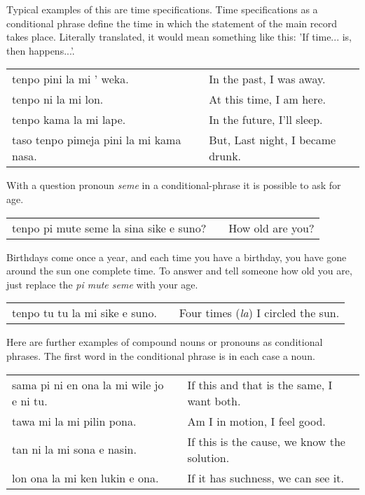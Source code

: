 Typical examples of this are time specifications. 
Time specifications as a conditional phrase define the time in which the statement of the main record takes place. 
Literally translated, it would mean something like this: 'If time... is, then happens...'. 

\begin{supertabular}{p{5,5cm}|ll}
tenpo pini la mi ' weka. && In the past, I was away. \\
tenpo ni la mi lon. && At this time, I am here. \\
tenpo kama la mi lape. && In the future, I'll sleep. \\
taso tenpo pimeja pini la mi kama nasa. && But, Last night, I became drunk. \\
\end{supertabular} 

With a question pronoun \textit{seme} in a conditional-phrase it is possible to ask for age.

\begin{supertabular}{p{5,5cm}|ll}
tenpo pi mute seme la sina sike e suno? && How old are you? \\
\end{supertabular} 

Birthdays come once a year, and each time you have a birthday, you have gone around the sun one complete time. 
To answer and tell someone how old you are, just replace the \textit{pi mute seme} with your age.

\begin{supertabular}{p{5,5cm}|ll}
tenpo tu tu la mi sike e suno. && Four times (\textit{la}) I circled the sun. \\
\end{supertabular} 

Here are further examples of compound nouns or pronouns as conditional phrases. 
The first word in the conditional phrase is in each case a noun.

\begin{supertabular}{p{5,5cm}|ll}
sama pi ni en ona la mi wile jo e ni tu. &&  If this and that is the same, I want both.\\
tawa mi la mi pilin pona. && Am I in motion, I feel good. \\
tan ni la mi sona e nasin. && If this is the cause, we know the solution. \\
lon ona la mi ken lukin e ona. && If it has suchness, we can see it. \\
\end{supertabular} 

